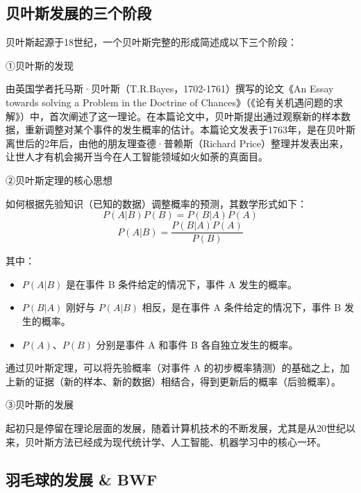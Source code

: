\documentclass[12pt]{article}
\begin{document}
\subsection{贝叶斯发展的三个阶段}
贝叶斯起源于18世纪，一个贝叶斯完整的形成简述成以下三个阶段：

①贝叶斯的发现

由英国学者托马斯·贝叶斯（T.R.Bayes，1702-1761）撰写的论文《An Essay towards solving a Problem in the Doctrine of Chances》（《论有关机遇问题的求解》）中，首次阐述了这一理论。在本篇论文中，贝叶斯提出通过观察新的样本数据，重新调整对某个事件的发生概率的估计。本篇论文发表于1763年，是在贝叶斯离世后的2年后，由他的朋友理查德·普赖斯（Richard Price）整理并发表出来，让世人才有机会揭开当今在人工智能领域如火如荼的真面目。

②贝叶斯定理的核心思想

如何根据先验知识（已知的数据）调整概率的预测，其数学形式如下：
\begin{equation}
	P(A|B){P(B)}={P(B|A)P(A)}
	\end{equation}
\begin{equation}
    P(A|B)=\frac{P(B|A)P(A)}{P(B)}
\end{equation}

其中：
\begin{itemize}
	\item $P(A|B)$ 是在事件 B 条件给定的情况下，事件 A 发生的概率。
	\item $P(B|A)$ 刚好与 $P(A|B)$ 相反，是在事件 A 条件给定的情况下，事件 B 发生的概率。
	\item $P(A)$、$P(B)$ 分别是事件 A 和事件 B 各自独立发生的概率。
	\end{itemize}

通过贝叶斯定理，可以将先验概率（对事件 A 的初步概率猜测）的基础之上，加上新的证据（新的样本、新的数据）相结合，得到更新后的概率（后验概率）。

③贝叶斯的发展

起初只是停留在理论层面的发展，随着计算机技术的不断发展，尤其是从20世纪以来，贝叶斯方法已经成为现代统计学、人工智能、机器学习中的核心一环。


\subsection{羽毛球的发展 \& BWF}

\end{document}
